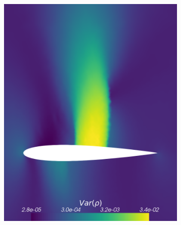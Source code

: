 \begin{figure}[h!]
\begin{subfigure}{0.3\linewidth}
		\includegraphics[scale=0.2]{figs/Euler2D/sc50UncertainMaSigma0-025PSigma1000-0Dim2_VarRho_log.png}
		\caption{}
		\label{fig:referenceSolutionsub2DVarLog}
	\end{subfigure}\\
	\begin{subfigure}{0.3\linewidth}
		\centering

\end{subfigure}
\end{figure}
